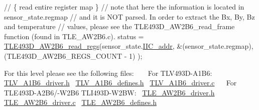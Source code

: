 \begin{DoxyCode}
\textcolor{comment}{// \{ read entire register map \}}
\textcolor{comment}{// note that here the information is located in sensor\_state.regmap}
\textcolor{comment}{// and it is NOT parsed. In order to extract the Bx, By, Bz and temperature}
\textcolor{comment}{// values, please see the TLE493D\_AW2B6\_read\_frame function (found in TLE\_AW2B6.c).}
status = \mbox{\hyperlink{_t_l_e___a_w2_b6__driver_8c_a1f4738c50bc41e827100b12d812b0fb5}{TLE493D\_AW2B6\_read\_regs}}(sensor\_state.\mbox{\hyperlink{struct_t_l_v493_d__data__t_a047c4ab12450e0186489f3bfadc8cbc4}{IIC\_addr}},
                                &(sensor\_state.regmap),
                                (TLE493D\_AW2B6\_REGS\_COUNT - 1)
);
\end{DoxyCode}


For this level please see the following files\+: ~\newline
 ~\newline
 For T\+L\+V493\+D-\/\+A1\+B6\+:~\newline
 \mbox{\hyperlink{_t_l_v___a1_b6__driver_8h}{T\+L\+V\+\_\+\+A1\+B6\+\_\+driver.\+h}}~\newline
 \mbox{\hyperlink{_t_l_v___a1_b6__defines_8h}{T\+L\+V\+\_\+\+A1\+B6\+\_\+defines.\+h}}~\newline
 \mbox{\hyperlink{_t_l_v___a1_b6__driver_8c}{T\+L\+V\+\_\+\+A1\+B6\+\_\+driver.\+c}}~\newline
 ~\newline
 For T\+L\+E493\+D-\/\+A2\+B6/-\/\+W2\+B6 T\+L\+I493\+D-\/\+W2\+BW\+:~\newline
 \mbox{\hyperlink{_t_l_e___a_w2_b6__driver_8h}{T\+L\+E\+\_\+\+A\+W2\+B6\+\_\+driver.\+h}}~\newline
 \mbox{\hyperlink{_t_l_e___a_w2_b6__driver_8c}{T\+L\+E\+\_\+\+A\+W2\+B6\+\_\+driver.\+c}}~\newline
 \mbox{\hyperlink{_t_l_e___a_w2_b6__defines_8h}{T\+L\+E\+\_\+\+A\+W2\+B6\+\_\+defines.\+h}}~\newline
 